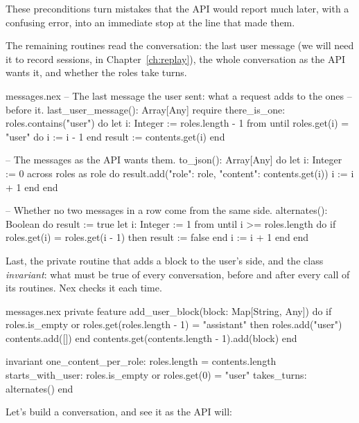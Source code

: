 These preconditions turn mistakes that the API would report much later,
with a confusing error, into an immediate stop at the line that made them.

The remaining routines read the conversation: the last user message (we
will need it to record sessions, in Chapter~\ref{ch:replay}), the whole
conversation as the API wants it, and whether the roles take turns.

\begin{continued}{messages.nex}
  -- The last message the user sent: what a request adds to the ones
  -- before it.
  last_user_message(): Array[Any]
  require
    there_is_one: roles.contains("user")
  do
    let i: Integer := roles.length - 1
    from until roles.get(i) = "user" do
      i := i - 1
    end
    result := contents.get(i)
  end

  -- The messages as the API wants them.
  to_json(): Array[Any] do
    let i: Integer := 0
    across roles as role do
      result.add({"role": role, "content": contents.get(i)})
      i := i + 1
    end
  end

  -- Whether no two messages in a row come from the same side.
  alternates(): Boolean do
    result := true
    let i: Integer := 1
    from until i >= roles.length do
      if roles.get(i) = roles.get(i - 1) then
        result := false
      end
      i := i + 1
    end
  end
\end{continued}

Last, the private routine that adds a block to the user's side, and the
class \emph{invariant}: what must be true of every conversation, before
and after every call of its routines. Nex checks it each time.

\begin{continued}{messages.nex}
  private feature
    add_user_block(block: Map[String, Any]) do
      if roles.is_empty or roles.get(roles.length - 1) = "assistant" then
        roles.add("user")
        contents.add([])
      end
      contents.get(contents.length - 1).add(block)
    end

invariant
  one_content_per_role: roles.length = contents.length
  starts_with_user: roles.is_empty or roles.get(0) = "user"
  takes_turns: alternates()
end
\end{continued}

Let's build a conversation, and see it as the API will:

